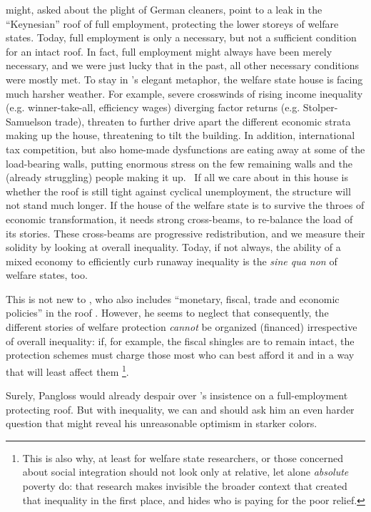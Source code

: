 \documentclass[11pt,a4paper,oneside]{article}
\begin{document}
\begin{enumerate}
	\citeauthor{Offe2003} might, asked about the plight of German cleaners, point to a leak in the ``Keynesian'' roof of full employment, protecting the lower storeys of welfare states. 
	Today, full employment is only a necessary, but not a sufficient condition for an intact roof. 
	In fact, full employment might always have been merely necessary, and we were just lucky that in the past, all other necessary conditions were mostly met. 
	To stay in \citeauthor{Offe2003}'s elegant metaphor, the welfare state house is facing much harsher weather. 
	For example, severe crosswinds of rising income inequality (e.g. winner-take-all, efficiency wages) diverging factor returns (e.g. Stolper-Samuelson trade), threaten to further drive apart the different economic strata making up the house, threatening to tilt the building. 
	In addition, international tax competition, but also home-made dysfunctions are eating away at some of the load-bearing walls, putting enormous stress on the few remaining walls and the (already struggling) people making it up.~
	If all we care about in this house is whether the roof is still tight against cyclical unemployment, the structure will not stand much longer. 
	If the house of the welfare state is to survive the throes of economic transformation, it needs strong cross-beams, to re-balance the load of its stories. 
	These cross-beams are progressive redistribution, and we measure their solidity by looking at overall inequality. 
	Today, if not always, the ability of a mixed economy to efficiently curb runaway inequality is the \emph{sine qua non} of welfare states, too. 
	
	This is not new to \cite{Offe2003}, who also includes ``monetary, fiscal, trade and economic policies'' in the roof \citeyearpar[543]{Offe2003}. 
	However, he seems to neglect that consequently, the different stories of welfare protection \emph{cannot} be organized (financed) irrespective of overall inequality: 
	if, for example, the fiscal shingles are to remain intact, the protection schemes must charge those most who can best afford it and in a way that will least affect them
	\footnote{
		This is also why, at least for welfare state researchers, or those concerned about social integration should not look only at relative, let alone \emph{absolute} poverty \citep[as][1, and many others]{Grow2005} do: 
		that research makes invisible the broader context that created that inequality in the first place, and hides who is paying for the poor relief.
	}. 
	
	Surely, Pangloss would already despair over \cite{Offe2003}'s insistence on a full-employment protecting roof. 
	But with inequality, we can and should ask him an even harder question that might reveal his unreasonable optimism in starker colors.
	

\end{enumerate}
\end{document}
